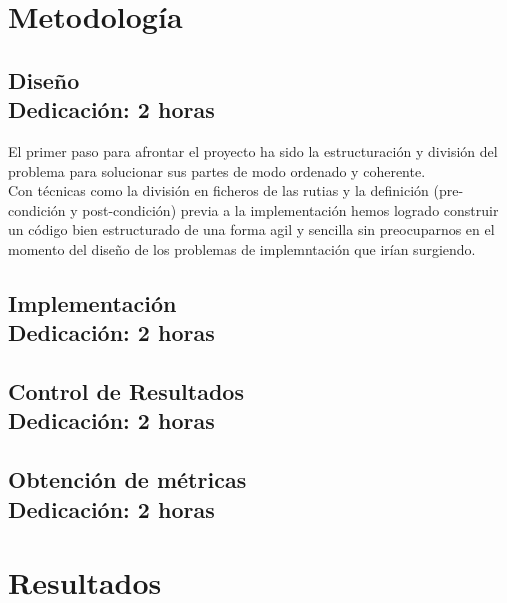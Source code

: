 \documentclass[12pt,letterpaper]{article}
\begin{document}
\clearpage
\section{Metodología}

\subsection{Diseño\\ {\small Dedicación: 2 horas}}

El primer paso para afrontar el proyecto ha sido la estructuración
y división del problema para solucionar sus partes de modo ordenado
y coherente.\\
Con técnicas como la división en ficheros de las rutias y la definición
(pre-condición y post-condición) previa a la implementación hemos logrado
construir un código bien estructurado de una forma agil y sencilla
sin preocuparnos en el momento del diseño de los problemas de implemntación
que irían surgiendo.\\

\subsection{Implementación\\ {\small Dedicación: 2 horas}}

\subsection{Control de Resultados\\ {\small Dedicación: 2 horas}}

\subsection{Obtención de métricas\\ {\small Dedicación: 2 horas}}



\section{Resultados}
\end{document}
